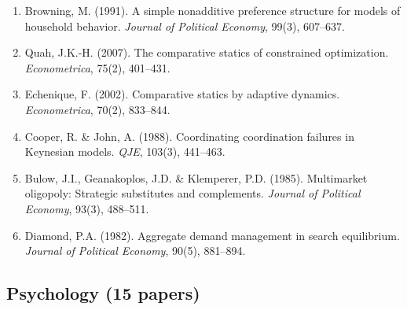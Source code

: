 \begin{enumerate}
    \item Browning, M. (1991). A simple nonadditive preference structure for models of household behavior. \textit{Journal of Political Economy}, 99(3), 607--637.
    \item Quah, J.K.-H. (2007). The comparative statics of constrained optimization. \textit{Econometrica}, 75(2), 401--431.
    \item Echenique, F. (2002). Comparative statics by adaptive dynamics. \textit{Econometrica}, 70(2), 833--844.
    \item Cooper, R. \& John, A. (1988). Coordinating coordination failures in Keynesian models. \textit{QJE}, 103(3), 441--463.
    \item Bulow, J.I., Geanakoplos, J.D. \& Klemperer, P.D. (1985). Multimarket oligopoly: Strategic substitutes and complements. \textit{Journal of Political Economy}, 93(3), 488--511.
    \item Diamond, P.A. (1982). Aggregate demand management in search equilibrium. \textit{Journal of Political Economy}, 90(5), 881--894.
\end{enumerate}

\subsection{Psychology (15 papers)}

